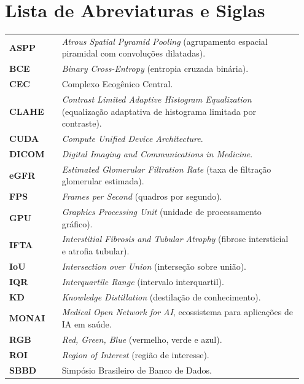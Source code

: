 \documentclass[12pt]{article}
\begin{document}
  \section*{Lista de Abreviaturas e Siglas}
  \begingroup
    \setlength{\parindent}{0pt}
    \renewcommand{\arraystretch}{1.18}
    \begin{tabular}{@{}p{0.17\linewidth}p{0.78\linewidth}@{}}
      \textbf{ASPP} & \textit{Atrous Spatial Pyramid Pooling} (agrupamento espacial piramidal com convoluções dilatadas).\\
      \textbf{BCE} & \textit{Binary Cross-Entropy} (entropia cruzada binária).\\
      \textbf{CEC} & Complexo Ecogênico Central.\\
      \textbf{CLAHE} & \textit{Contrast Limited Adaptive Histogram Equalization} (equalização adaptativa de histograma limitada por contraste).\\
      \textbf{CUDA} & \textit{Compute Unified Device Architecture}.\\
      \textbf{DICOM} & \textit{Digital Imaging and Communications in Medicine}.\\
      \textbf{eGFR} & \textit{Estimated Glomerular Filtration Rate} (taxa de filtração glomerular estimada).\\
      \textbf{FPS} & \textit{Frames per Second} (quadros por segundo).\\
      \textbf{GPU} & \textit{Graphics Processing Unit} (unidade de processamento gráfico).\\
      \textbf{IFTA} & \textit{Interstitial Fibrosis and Tubular Atrophy} (fibrose intersticial e atrofia tubular).\\
      \textbf{IoU} & \textit{Intersection over Union} (interseção sobre união).\\
      \textbf{IQR} & \textit{Interquartile Range} (intervalo interquartil).\\
      \textbf{KD} & \textit{Knowledge Distillation} (destilação de conhecimento).\\
      \textbf{MONAI} & \textit{Medical Open Network for AI}, ecossistema para aplicações de IA em saúde.\\
      \textbf{RGB} & \textit{Red, Green, Blue} (vermelho, verde e azul).\\
      \textbf{ROI} & \textit{Region of Interest} (região de interesse).\\
      \textbf{SBBD} & Simpósio Brasileiro de Banco de Dados.\\
    \end{tabular}
  \endgroup
  \clearpage
\end{document}
